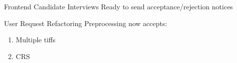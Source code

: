 




\begin{frame}{Frontend Candidate Interviews}
    Ready to send acceptance/rejection notices
\end{frame}

\begin{frame}{User Request Refactoring}
    Preprocessing now accepts:
    \begin{enumerate}
        \item Multiple tiffs
        \item CRS
    \end{enumerate}
\end{frame}

